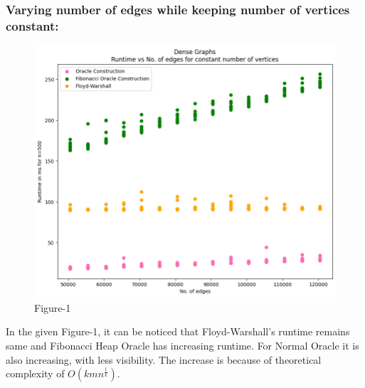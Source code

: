 \documentclass[12pt, a4paper]{article}
\begin{document}
    \subsubsection{ Varying number of edges while keeping number of vertices constant:}
    \begin{figure}[H]
    \caption*{Figure-1}
    \includegraphics[scale=0.4]{./images/1}
    \centering
    \end{figure}
    In the given Figure-1, it can be noticed that Floyd-Warshall's runtime remains same and Fibonacci Heap Oracle has increasing runtime. For Normal Oracle it is also increasing, with less visibility. The increase is because of theoretical complexity of $O(kmn^{\frac{1}{k}})$.
\end{document}

